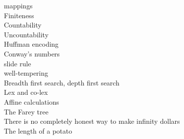\begin{description}
\item[mappings]

\item[Finiteness]

\item[Countability]
\item[Uncountability]

\item[Huffman encoding]
\item[Conway's numbers]

\item[slide rule]
\item[well-tempering]

\item[Breadth first search, depth first search]
\item[Lex and co-lex] 

\item[Affine calculations]

\item[The Farey tree]

\item[There is no completely honest way to make infinity dollars]

\item[The length of a potato]


\end{description}


